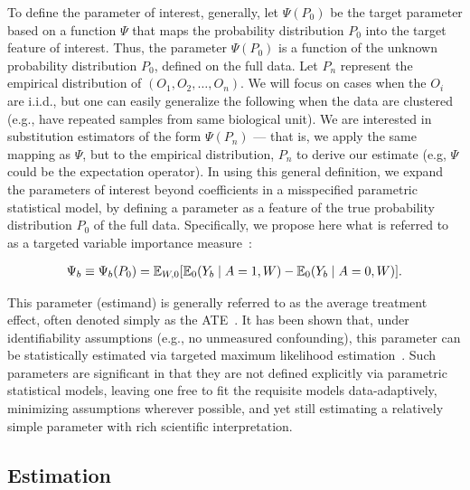 To define the parameter of interest, generally, let $\Psi(P_{0})$ be the
target parameter based on a function $\Psi$ that maps the probability
distribution $P_{0}$ into the target feature of interest. Thus, the parameter
$\Psi(P_{0})$ is a function of the unknown probability distribution $P_{0}$,
defined on the full data. Let $P_{n}$ represent the  empirical distribution of
$(O_{1},O_{2}, \dots, O_{n})$. We will focus on cases when the $O_i$ are
i.i.d., but one can easily generalize the following when the data are clustered
(e.g., have repeated samples from same biological unit). We are interested in
substitution estimators of the form $\Psi(P_{n})$ --- that is, we apply the same
mapping as $\Psi$, but to the empirical distribution, $P_n$ to derive our
estimate (e.g, $\Psi$ could be the expectation operator). In using this general
definition, we expand the parameters of interest beyond coefficients in a
misspecified parametric statistical model, by defining a parameter as a feature
of the true probability distribution $P_{0}$ of the full data. Specifically, we
propose here what is referred to as a targeted variable importance
measure~\cite{bembom2009biomarker}:

\begin{eqnarray}
\label{targetparam}
\Psi_{b} \equiv \Psi_{b}(P_{0}) = \mathbb{E} _{W,0}[\mathbb{E}_{0}(Y_{b} \mid A = 1, W) - \mathbb{E}_{0}(Y_{b} \mid A = 0, W)].
\end{eqnarray}

This parameter (estimand) is generally referred to as the average treatment
effect, often denoted simply as the ATE~\cite{rosenbaum1983central}. It has
been shown that, under identifiability assumptions (e.g., no unmeasured
confounding), this parameter can be statistically estimated via targeted
maximum likelihood estimation~\cite{van2011targeted}. Such parameters are
significant in that they are not defined explicitly via parametric statistical
models, leaving one free to fit the requisite models data-adaptively, minimizing
assumptions wherever possible, and yet still estimating a relatively simple
parameter with rich scientific interpretation.

\subsection{Estimation}\label{estimation}

